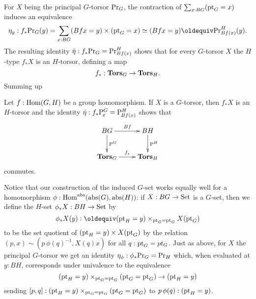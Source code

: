 For $X$ being the principal $G$-torsor  $\mathrm{Pr}_{{G}}$, the contraction of $\sum_{x:BG}(\mathrm{pt}_G=x)$ induces an equivalence
$$\eta_y:f_*\princ G(y)=\sum_{x:BG}(Bfx=y)\times(\pt_G=x)\simeq (Bfx=y)\oldequiv\princ{Bf(x)}^H(y).$$  The resulting identity $\bar\eta:f_*\mathrm{Pr}_{{G}}=\mathrm{Pr}_{{Bf(x)}}^H$ shows that for every $G$-torsor $X$ the $H$-type $f_*X$ is an $H$-torsor, defining a map 
$$f_*:\mathbf{Tors}_G\to\mathbf{Tors}_H.$$
Summing up
\begin{lemma}
  \label{lem:inducedtorsor}
   Let $f:\mathrm{Hom}(G,H)$ be a group homomorphism.  
If $X$ is a $G$-torsor, then $f_*X$ is an $H$-torsor and the identity 
$\bar{\eta}:f_*\mathrm{P}_{\!x}^G=\mathrm{P}_{\!Bf(x)}^H$
shows that  
$$\xymatrix{BG\ar[r]^{Bf}\ar[d]^{\pathsp{}^G}&BH\ar[d]^{\pathsp{}^H}\\
\typetorsor_G\ar[r]^{f_*}&\typetorsor_H}$$ 
commutes.
\end{lemma}
\begin{remark}
  \label{rem:inducedGsetfromabstracthomomorphisms}
  Notice that our construction of the induced $G$-set works equally well for a homomorphism $\phi:\mathrm{Hom}^{\mathrm{abs}}(\mathrm{abs}(G),\mathrm{abs}(H))$:
  if $X:BG\to\mathord{\mathrm{Set}}$ is a $G$-set, then we define the $H$-set $\phi_*X:BH\to\mathord{\mathrm{Set}}$ by 
  $$\phi_*X(y)\defequi(\pt_H=y)\times_{\pt_G=\pt_G}X(\pt_G)$$
  to be the set quotient of $(\mathrm{pt}_H=y)\times X(\mathrm{pt}_G)$ by the relation $(p,x)\sim(p\, \phi(q)^{-1},X(q)x)$ for all $q:\mathrm{pt}_G=pt_G$.
  Just as above, for $X$ the principal $G$-torsor we get an identity  $\eta_\phi:\phi_*\mathrm{Pr}_{{G}}=\mathrm{Pr}_{{H}}$ which, when evaluated at $y:BH$, corresponds under univalence to the equivalence 
$$(\mathrm{pt}_H=y)\times_{\mathrm{pt}_G=\mathrm{pt}_G}(\mathrm{pt}_G=\mathrm{pt}_G)\to (\mathrm{pt}_H=y)$$ 
sending $[p,q]:(\mathrm{pt}_H=y)\times_{\mathrm{pt}_G=\mathrm{pt}_G}(\mathrm{pt}_G=\mathrm{pt}_G)$ to $p\,\phi(q):(\mathrm{pt}_H=y)$.
\end{remark}



